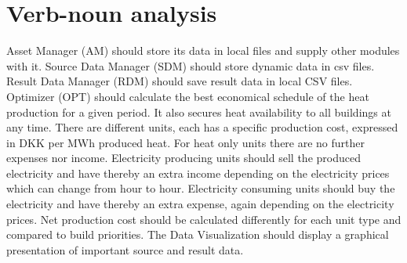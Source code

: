 
\section{Verb-noun analysis}

\textcolor{nounred}{Asset Manager (AM)} should \textcolor{verbblue}{store} its \textcolor{nounred}{data} in local \textcolor{nounred}{files} and \textcolor{verbblue}{supply} other \textcolor{nounred}{modules} with it. \textcolor{nounred}{Source Data Manager (SDM)} should \textcolor{verbblue}{store} \textcolor{nounred}{dynamic data} in \textcolor{nounred}{csv files}. \textcolor{nounred}{Result Data Manager (RDM)} should \textcolor{verbblue}{save} \textcolor{nounred}{result data} in local \textcolor{nounred}{CSV files}. \textcolor{nounred}{Optimizer (OPT)} should \textcolor{verbblue}{calculate} the best \textcolor{nounred}{economical schedule} of the \textcolor{nounred}{heat production} for a given \textcolor{nounred}{period}. It also \textcolor{verbblue}{secures} \textcolor{nounred}{heat availability} to all \textcolor{nounred}{buildings} at any \textcolor{nounred}{time}. There are different \textcolor{nounred}{units}, each \textcolor{verbblue}{has} a specific \textcolor{nounred}{production cost}, expressed in \textcolor{nounred}{DKK} per MWh produced \textcolor{nounred}{heat}. For \textcolor{nounred}{heat only units} there are no further \textcolor{nounred}{expenses} nor \textcolor{nounred}{income}. \textcolor{nounred}{Electricity producing units} should \textcolor{verbblue}{sell} the produced \textcolor{nounred}{electricity} and \textcolor{verbblue}{have} thereby an extra \textcolor{nounred}{income} depending on the \textcolor{nounred}{electricity prices} which can \textcolor{verbblue}{change} from \textcolor{nounred}{hour} to \textcolor{nounred}{hour}. \textcolor{nounred}{Electricity consuming units} should \textcolor{verbblue}{buy} the \textcolor{nounred}{electricity} and \textcolor{verbblue}{have} thereby an extra \textcolor{nounred}{expense}, again depending on the \textcolor{nounred}{electricity prices}. \textcolor{nounred}{Net production cost} should be \textcolor{verbblue}{calculated} differently for each \textcolor{nounred}{unit type} and \textcolor{verbblue}{compared} to build \textcolor{nounred}{priorities}. The \textcolor{nounred}{Data Visualization} should \textcolor{verbblue}{display} a \textcolor{nounred}{graphical presentation} of important \textcolor{nounred}{source and result data}.

